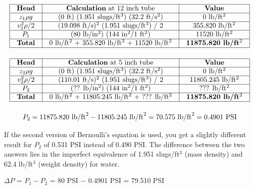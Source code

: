 $$\vbox{\offinterlineskip
\halign{\strut
\vrule \quad\hfil # \ \hfil & 
\vrule \quad\hfil # \ \hfil & 
\vrule \quad\hfil # \ \hfil \vrule \cr
\noalign{\hrule}
%
{\bf Head} & {\bf Calculation} at 12 inch tube & {\bf Value} \cr
%
\noalign{\hrule}
%
$z_1 \rho g$ & (0 ft) (1.951 slugs/ft$^{3}$) (32.2 ft/s$^{2}$) & 0 lb/ft$^{2}$ \cr
%
\noalign{\hrule}
%
$v_1^2 \rho / 2$ & (19.098 ft/s)$^{2}$ (1.951 slugs/ft$^{3}$) / 2 & 355.820 lb/ft$^{2}$ \cr
%
\noalign{\hrule}
%
$P_1$ & (80 lb/in$^{2}$) (144 in$^{2}$/1 ft$^{2}$) & 11520 lb/ft$^{2}$ \cr
%
\noalign{\hrule}
%
{\bf Total} &  0 lb/ft$^{2}$ + 355.820 lb/ft$^{2}$ + 11520 lb/ft$^{2}$ & {\bf 11875.820 lb/ft$^{2}$} \cr
%
\noalign{\hrule}
} %
}$$ %

\vskip 10pt


$$\vbox{\offinterlineskip
\halign{\strut
\vrule \quad\hfil # \ \hfil & 
\vrule \quad\hfil # \ \hfil & 
\vrule \quad\hfil # \ \hfil \vrule \cr
\noalign{\hrule}
%
{\bf Head} & {\bf Calculation} at 5 inch tube & {\bf Value} \cr
%
\noalign{\hrule}
%
$z_2 \rho g$ & (0 ft) (1.951 slugs/ft$^{3}$) (32.2 ft/s$^{2}$) & 0 lb/ft$^{2}$ \cr
%
\noalign{\hrule}
%
$v_2^2 \rho / 2$ & (110.01 ft/s)$^{2}$ (1.951 slugs/ft$^{3}$) / 2 & 11805.245 lb/ft$^{2}$ \cr
%
\noalign{\hrule}
%
$P_2$ & (?? lb/in$^{2}$) (144 in$^{2}$/1 ft$^{2}$) & ??? lb/ft$^{2}$ \cr
%
\noalign{\hrule}
%
{\bf Total} &  0 lb/ft$^{2}$ + 11805.245 lb/ft$^{2}$ + ??? lb/ft$^{2}$ & {\bf 11875.820 lb/ft$^{2}$} \cr
%
\noalign{\hrule}
} %
}$$ %

$$P_2 = 11875.820 \hbox{ lb/ft}^2 - 11805.245 \hbox{ lb/ft}^2 = 70.575 \hbox{ lb/ft}^2 = 0.4901 \hbox{ PSI}$$

\vskip 10pt

If the second version of Bernoulli's equation is used, you get a slightly different result for $P_2$ of 0.531 PSI instead of 0.490 PSI.  The difference between the two answers lies in the imperfect equivalence of 1.951 slugs/ft$^{3}$ (mass density) and 62.4 lb/ft$^{3}$ (weight density) for water.

\vskip 10pt

$\Delta P$ = $P_1 - P_2$ = 80 PSI $-$ 0.4901 PSI = 79.510 PSI




